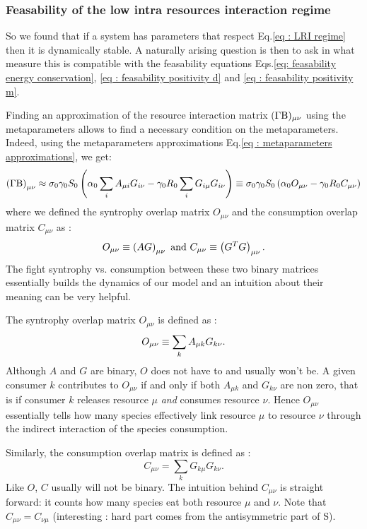 \documentclass[12pt]{report}
\begin{document}
\subsubsection{Feasability of the low intra resources interaction regime}
So we found that if a system has parameters that respect Eq.\eqref{eq : LRI regime} then it is dynamically stable. A naturally arising question is then to ask in what measure this is compatible with the feasability equations Eqs.\eqref{eq: feasability energy conservation}, \eqref{eq : feasability positivity d} and \eqref{eq : feasability positivity m}.

\noindent Finding an approximation of the resource interaction matrix $(\Gamma\text{B})_{\mu \nu}$ using the metaparameters allows to find a necessary condition on the metaparameters. Indeed, using the metaparameters approximations Eq.\eqref{eq : metaparameters approximations}, we get:
\begin{equation}\label{eq : metaparam approximation GammaBeta}
\left(\Gamma \text{B}\right)_{\mu \nu}\approx \sigma_0 \gamma_0 S_0 \left(\alpha_0 \sum_i A_{\mu i}G_{i\nu}-\gamma_0 R_0 \sum_i G_{i\mu}G_{i\nu}\right)\equiv \sigma_0 \gamma_0 S_0 \left(\alpha_0 O_{\mu \nu}-\gamma_0R_0 C_{\mu\nu}\right)
\end{equation}
where we defined the syntrophy overlap matrix $O_{\mu\nu}$ and the consumption overlap matrix $C_{\mu\nu}$ as :
\begin{equation}
O_{\mu\nu} \equiv \left(AG\right)_{\mu \nu} \text{ and } C_{\mu\nu} \equiv \left(G^TG\right)_{\mu\nu}.
\end{equation}
The fight syntrophy vs. consumption between these two binary matrices essentially builds the dynamics of our model and an intuition about their meaning can be very helpful.

The syntrophy overlap matrix $O_{\mu\nu}$ is defined as :
\begin{equation}
O_{\mu\nu} \equiv \sum_k A_{\mu k} G_{k\nu}.
\end{equation}
Although $A$ and $G$ are binary, $O$ does not have to and usually won't be. A given consumer $k$ contributes to $O_{\mu\nu}$ if and only if both $A_{\mu k}$ and $G_{k\nu}$ are non zero, that is if consumer $k$ releases resource $\mu$ \textit{and} consumes resource $\nu$. Hence $O_{\mu\nu}$ essentially tells how many species effectively link resource $\mu$ to resource $\nu$ through the indirect interaction of the species consumption.

\noindent Similarly, the consumption overlap matrix is defined as :
\begin{equation}
C_{\mu\nu}=\sum_k G_{k \mu}G_{k \nu}.
\end{equation}
Like $O$, $C$ usually will not be binary. The intuition behind $C_{\mu\nu}$ is straight forward: it counts how many species eat both resource $\mu$ and $\nu$. Note that $C_{\mu\nu}=C_{\nu\mu}$ (interesting : hard part comes from the antisymmetric part of S).
\end{document}
